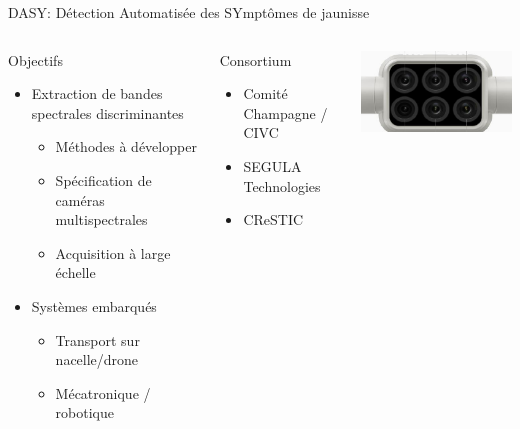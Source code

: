 \documentclass[presentation, aspectratio=169]{beamer}
\begin{document}
\begin{frame}{DASY: Détection Automatisée des SYmptômes de jaunisse}
  \begin{columns}
    \begin{block}{Objectifs}
      \begin{itemize}
      \item Extraction de bandes spectrales discriminantes
        \begin{itemize}
        \item Méthodes à développer
        \item Spécification de caméras multispectrales
        \item Acquisition à large échelle
        \end{itemize}
      \item Systèmes embarqués
        \begin{itemize}
        \item Transport sur nacelle/drone
        \item Mécatronique / robotique
        \end{itemize}
      \end{itemize}
    \end{block}

    \begin{block}{Consortium}
      \begin{itemize}
      \item Comité Champagne / CIVC
      \item SEGULA Technologies
      \item CReSTIC
      \end{itemize}
    \end{block}
    \includegraphics[width=.9\textwidth]{camera}
  \end{columns}
\end{frame}
\end{document}

